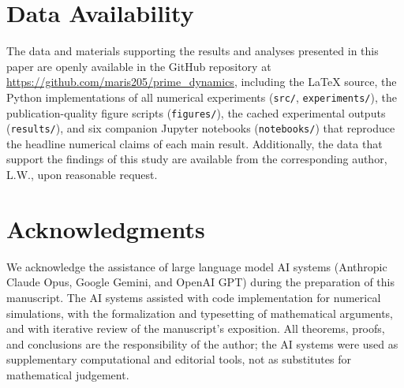 \documentclass[11pt,a4paper]{article}
\theoremstyle{definition}
\begin{document}
\section*{Data Availability}
The data and materials supporting the results and analyses presented
in this paper are openly available in the GitHub repository at
\url{https://github.com/maris205/prime_dynamics}, including the LaTeX
source, the Python implementations of all numerical experiments
(\texttt{src/}, \texttt{experiments/}), the publication-quality figure
scripts (\texttt{figures/}), the cached experimental outputs
(\texttt{results/}), and six companion Jupyter notebooks
(\texttt{notebooks/}) that reproduce the headline numerical claims of
each main result. Additionally, the data that support the findings of
this study are available from the corresponding author, L.W., upon
reasonable request.

\section*{Acknowledgments}
We acknowledge the assistance of large language model AI systems
(Anthropic Claude Opus, Google Gemini, and OpenAI GPT) during the
preparation of this manuscript. The AI systems assisted with code
implementation for numerical simulations, with the formalization and
typesetting of mathematical arguments, and with iterative review of
the manuscript's exposition. All theorems, proofs, and conclusions
are the responsibility of the author; the AI systems were used as
supplementary computational and editorial tools, not as substitutes
for mathematical judgement.



\end{document}
